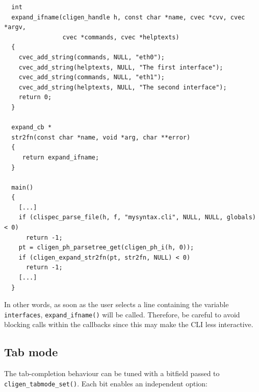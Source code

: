 \documentclass[a4paper, 10pt] {article}
\begin{document}
\begin{verbatim}
  int 
  expand_ifname(cligen_handle h, const char *name, cvec *cvv, cvec *argv,
                cvec *commands, cvec *helptexts)
  {
    cvec_add_string(commands, NULL, "eth0");
    cvec_add_string(helptexts, NULL, "The first interface");
    cvec_add_string(commands, NULL, "eth1");
    cvec_add_string(helptexts, NULL, "The second interface");
    return 0;
  }

  expand_cb *
  str2fn(const char *name, void *arg, char **error)
  {
     return expand_ifname;
  }

  main()
  {   
    [...]
    if (clispec_parse_file(h, f, "mysyntax.cli", NULL, NULL, globals) < 0)
      return -1;
    pt = cligen_ph_parsetree_get(cligen_ph_i(h, 0));
    if (cligen_expand_str2fn(pt, str2fn, NULL) < 0)
      return -1;
    [...]
  }
\end{verbatim}

In other words, as soon as the user selects a line containing the
variable {\tt interfaces}, {\tt expand\_ifname()} will be
called. Therefore, be careful to avoid blocking calls within the
callbacks since this may make the CLI less interactive.

\subsection{Tab mode}
\label{sec:tabmode}

The tab-completion behaviour can be tuned with a bitfield passed to
{\tt cligen\_tabmode\_set()}.  Each bit enables an independent option:
\end{document}
